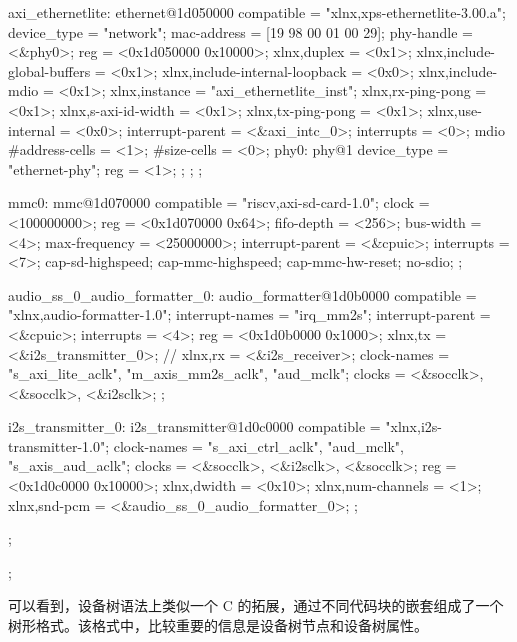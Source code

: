 \begin{CodeBlock}[language=BookDTS]
{{        axi_ethernetlite: ethernet@1d050000 {
            compatible = "xlnx,xps-ethernetlite-3.00.a";
            device_type = "network";
            mac-address = [19 98 00 01 00 29];
            phy-handle = <&phy0>;
            reg = <0x1d050000 0x10000>;
            xlnx,duplex = <0x1>;
            xlnx,include-global-buffers = <0x1>;
            xlnx,include-internal-loopback = <0x0>;
            xlnx,include-mdio = <0x1>;
            xlnx,instance = "axi_ethernetlite_inst";
            xlnx,rx-ping-pong = <0x1>;
            xlnx,s-axi-id-width = <0x1>;
            xlnx,tx-ping-pong = <0x1>;
            xlnx,use-internal = <0x0>;
            interrupt-parent = <&axi_intc_0>;
            interrupts = <0>;
            mdio {
                #address-cells = <1>;
                #size-cells = <0>;
                phy0: phy@1 {
                    device_type = "ethernet-phy";
                    reg = <1>;
                } ;
            } ;
        } ;

        mmc0: mmc@1d070000 {
            compatible = "riscv,axi-sd-card-1.0";
            clock = <100000000>;
            reg = <0x1d070000 0x64>;
            fifo-depth = <256>;
            bus-width = <4>;
            max-frequency = <25000000>;
            interrupt-parent = <&cpuic>;
            interrupts = <7>;
            cap-sd-highspeed;
            cap-mmc-highspeed;
            cap-mmc-hw-reset;
            no-sdio;
        };

        audio_ss_0_audio_formatter_0: audio_formatter@1d0b0000 {
            compatible = "xlnx,audio-formatter-1.0";
            interrupt-names = "irq_mm2s";
            interrupt-parent = <&cpuic>;
            interrupts = <4>;
            reg = <0x1d0b0000 0x1000>;
            xlnx,tx = <&i2s_transmitter_0>;
            // xlnx,rx = <&i2s_receiver>;
            clock-names = "s_axi_lite_aclk", "m_axis_mm2s_aclk", "aud_mclk";
            clocks = <&socclk>, <&socclk>, <&i2sclk>;
        };

        i2s_transmitter_0: i2s_transmitter@1d0c0000 {
            compatible = "xlnx,i2s-transmitter-1.0";
            clock-names = "s_axi_ctrl_aclk", "aud_mclk", "s_axis_aud_aclk";
            clocks = <&socclk>, <&i2sclk>, <&socclk>;
            reg = <0x1d0c0000 0x10000>;
            xlnx,dwidth = <0x10>;
            xlnx,num-channels = <1>;
            xlnx,snd-pcm = <&audio_ss_0_audio_formatter_0>;
        };
    };
};
\end{CodeBlock}

可以看到，设备树语法上类似一个 C 的拓展，通过不同代码块的嵌套组成了一个树形格式。该格式中，比较重要的信息是设备树节点和设备树属性。

